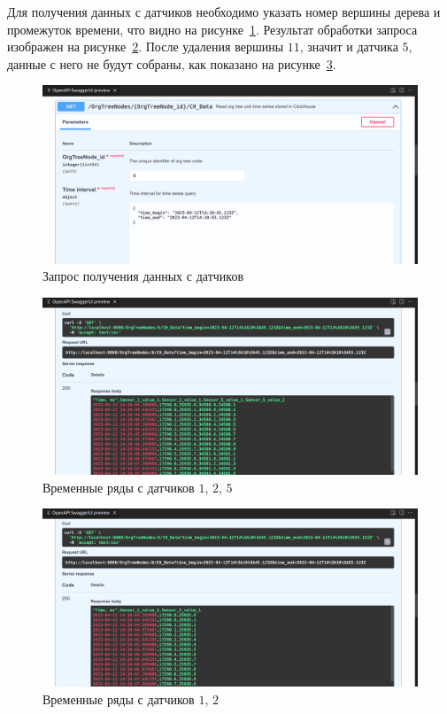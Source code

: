 Для получения данных с датчиков необходимо указать номер вершины дерева и промежуток времени, что видно на рисунке~\ref{swagger7}. Результат обработки запроса изображен на рисунке~\ref{swagger8}. После удаления вершины $11$, значит и датчика $5$, данные с него не будут собраны, как показано на рисунке~\ref{swagger9}.

\begin{figure}
    \includegraphics[scale=0.2]{img/swagger7.png}
    \caption{Запрос получения данных с датчиков}
    \label{swagger7}
\end{figure}

\begin{figure}
    \includegraphics[scale=0.2]{img/swagger8.png}
    \caption{Временные ряды с датчиков $1$, $2$, $5$}
    \label{swagger8}
\end{figure}

\begin{figure}
    \includegraphics[scale=0.2]{img/swagger9.png}
    \caption{Временные ряды с датчиков $1$, $2$}
    \label{swagger9}
\end{figure}

